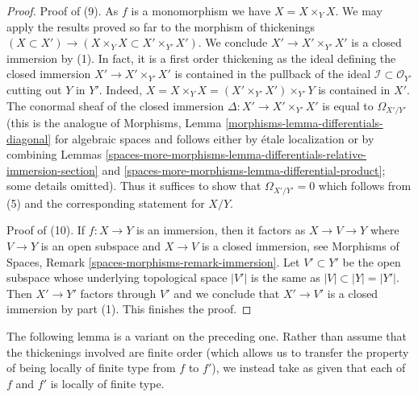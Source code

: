 \begin{proof}
\medskip\noindent
Proof of (9). As $f$ is a monomorphism we have $X = X \times_Y X$.
We may apply the results proved so far to the morphism
of thickenings $(X \subset X') \to (X \times_Y X \subset X' \times_{Y'} X')$.
We conclude $X' \to X' \times_{Y'} X'$ is a closed immersion by (1).
In fact, it is a first order thickening as the ideal defining the
closed immersion $X' \to X' \times_{Y'} X'$ is contained in the pullback
of the ideal $\mathcal{I} \subset \mathcal{O}_{Y'}$ cutting out $Y$ in $Y'$.
Indeed, $X = X \times_Y X = (X' \times_{Y'} X') \times_{Y'} Y$ is contained
in $X'$. The conormal sheaf of the closed immersion
$\Delta : X' \to X' \times_{Y'} X'$ is equal to $\Omega_{X'/Y'}$
(this is the analogue of
Morphisms, Lemma \ref{morphisms-lemma-differentials-diagonal}
for algebraic spaces and follows either by \'etale localization
or by combining
Lemmas \ref{spaces-more-morphisms-lemma-differentials-relative-immersion-section} and
\ref{spaces-more-morphisms-lemma-differential-product}; some details omitted).
Thus it suffices to show that $\Omega_{X'/Y'} = 0$ which follows from (5)
and the corresponding statement for $X/Y$.

\medskip\noindent
Proof of (10). If $f : X \to Y$ is an immersion, then it factors as
$X \to V \to Y$ where $V \to Y$ is an open subspace and $X \to V$ is a
closed immersion, see
Morphisms of Spaces, Remark \ref{spaces-morphisms-remark-immersion}.
Let $V' \subset Y'$ be the open subspace whose
underlying topological space $|V'|$ is the same as $|V| \subset |Y| = |Y'|$.
Then $X' \to Y'$ factors through $V'$ and we conclude that $X' \to V'$
is a closed immersion by part (1). This finishes the proof.
\end{proof}

The following lemma is a variant on the preceding one. Rather than assume
that the thickenings involved are finite order (which allows us to transfer
the property of being locally of finite type from $f$ to $f'$),
we instead take as given that each of $f$ and $f'$ is locally of
finite type.

